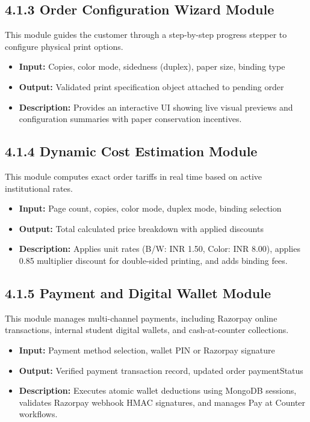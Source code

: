 \documentclass[12pt,a4paper]{report}
\begin{document}
\subsection{4.1.3 Order Configuration Wizard Module}
This module guides the customer through a step-by-step progress stepper to configure physical print options.
\begin{itemize}[leftmargin=0.35in, itemsep=1pt]
  \item \textbf{Input:} Copies, color mode, sidedness (duplex), paper size, binding type
  \item \textbf{Output:} Validated print specification object attached to pending order
  \item \textbf{Description:} Provides an interactive UI showing live visual previews and configuration summaries with paper conservation incentives.
\end{itemize}

\subsection{4.1.4 Dynamic Cost Estimation Module}
This module computes exact order tariffs in real time based on active institutional rates.
\begin{itemize}[leftmargin=0.35in, itemsep=1pt]
  \item \textbf{Input:} Page count, copies, color mode, duplex mode, binding selection
  \item \textbf{Output:} Total calculated price breakdown with applied discounts
  \item \textbf{Description:} Applies unit rates (B/W: INR 1.50, Color: INR 8.00), applies 0.85 multiplier discount for double-sided printing, and adds binding fees.
\end{itemize}

\subsection{4.1.5 Payment and Digital Wallet Module}
This module manages multi-channel payments, including Razorpay online transactions, internal student digital wallets, and cash-at-counter collections.
\begin{itemize}[leftmargin=0.35in, itemsep=1pt]
  \item \textbf{Input:} Payment method selection, wallet PIN or Razorpay signature
  \item \textbf{Output:} Verified payment transaction record, updated order paymentStatus
  \item \textbf{Description:} Executes atomic wallet deductions using MongoDB sessions, validates Razorpay webhook HMAC signatures, and manages Pay at Counter workflows.
\end{itemize}
\end{document}
